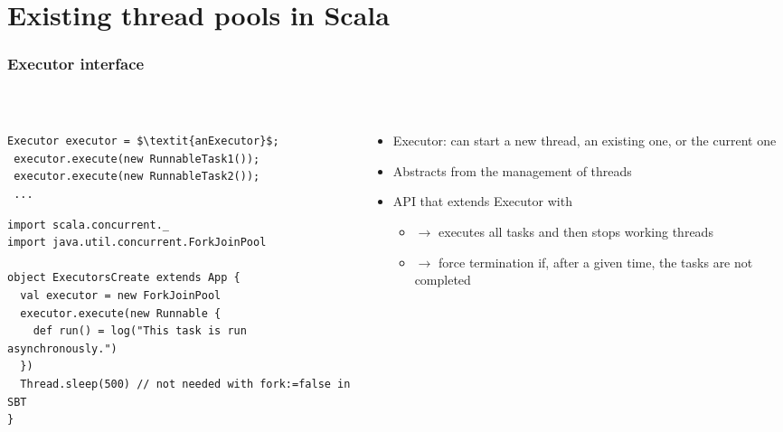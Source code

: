 \documentclass[aspectratio=169]{beamer}
\begin{document}
\section{Existing thread pools in Scala}


\begin{frame}[fragile]\frametitle{Executor interface}
~\\[-8mm]
\begin{columns}
\begin{column}{0.54\textwidth}
\begin{lstlisting}[emph={executor}]
 Executor executor = $\textit{anExecutor}$;
 executor.execute(new RunnableTask1());
 executor.execute(new RunnableTask2());
 ...
\end{lstlisting}
\begin{lstlisting}[emph={executor}]
import scala.concurrent._
import java.util.concurrent.ForkJoinPool

object ExecutorsCreate extends App {
  val executor = new ForkJoinPool
  executor.execute(new Runnable {
    def run() = log("This task is run asynchronously.")
  })
  Thread.sleep(500) // not needed with fork:=false in SBT
}
\end{lstlisting}
\end{column}
\begin{column}{0.49\textwidth}
\begin{itemize}
  \item \alert{Executor:} can start a new thread, an existing one, or the current one
  \item Abstracts from the management of threads
  \item {} API that extends Executor with 
    \begin{itemize}
      \item {} $\to$ executes all tasks and then stops working threads
      \item {} $\to$ force termination if, after a given time, the tasks are not completed
    \end{itemize}
\end{itemize}
\end{column}
\end{columns}
\end{frame}
\end{document}
